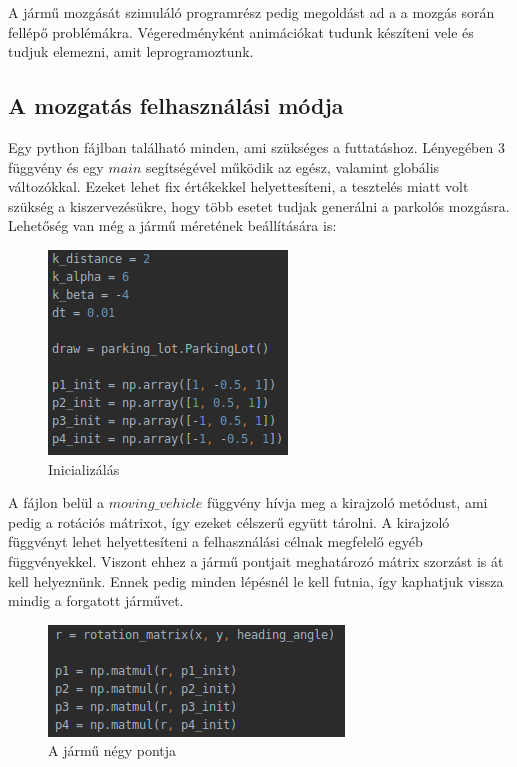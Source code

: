 
A jármű mozgását szimuláló programrész pedig megoldást ad a a mozgás során fellépő problémákra. Végeredményként animációkat tudunk készíteni vele és tudjuk elemezni, amit leprogramoztunk. 

\subsection{A mozgatás felhasználási módja}
Egy python fájlban található minden, ami szükséges a futtatáshoz. Lényegében 3 függvény és egy $ main $ segítségével működik az egész, valamint globális változókkal. Ezeket lehet fix értékekkel helyettesíteni, a tesztelés miatt volt szükség a kiszervezésükre, hogy több esetet tudjak generálni a parkolós mozgásra. Lehetőség van még a jármű méretének beállítására is:

\begin{figure}[h!]
\centering
\includegraphics[scale=0.75]{images/init_for_vehicle_moving.png}
\caption{Inicializálás}
\label{fig:init_for_vehicle_moving}
\end{figure}

A fájlon belül a $ moving\_vehicle $ függvény hívja meg a kirajzoló metódust, ami pedig a rotációs mátrixot, így ezeket célszerű együtt tárolni. A kirajzoló függvényt lehet helyettesíteni a felhasználási célnak megfelelő egyéb függvényekkel. Viszont ehhez a jármű pontjait meghatározó mátrix szorzást is át kell helyeznünk. Ennek pedig minden lépésnél le kell futnia, így kaphatjuk vissza mindig a forgatott járművet.

\begin{figure}[h!]
\centering
\includegraphics[scale=0.75]{images/rotation.png}
\caption{A jármű négy pontja}
\label{fig:rotation}
\end{figure}

